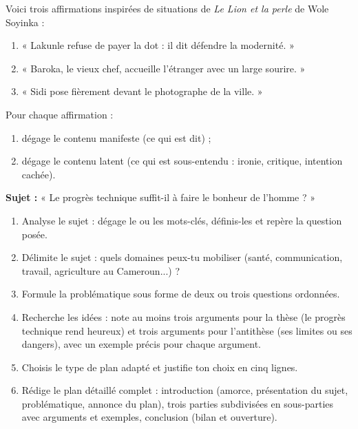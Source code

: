 \documentclass[11pt]{article}
\newcounter{popsec}
\newcounter{popsub}
\newcommand{\courssub}[1]{%
  \stepcounter{popsub}%
  \par\vspace{9pt}\noindent{\popxbold\fontsize{11.5}{13}\selectfont\color{popink}{\color{poporange}\thepopsec.\thepopsub}\hspace{6pt}#1}\par\nopagebreak\vspace{4pt}
}
\begin{document}
\begin{exercice}
Voici trois affirmations inspirées de situations de \emph{Le Lion et la perle} de Wole Soyinka :
\begin{enumerate}
\item « Lakunle refuse de payer la dot : il dit défendre la modernité. »
\item « Baroka, le vieux chef, accueille l'étranger avec un large sourire. »
\item « Sidi pose fièrement devant le photographe de la ville. »
\end{enumerate}
Pour chaque affirmation :
\begin{enumerate}[label=\alph*.]
\item dégage le contenu manifeste (ce qui est dit) ;
\item dégage le contenu latent (ce qui est sous-entendu : ironie, critique, intention cachée).
\end{enumerate}
\end{exercice}

\courssub{Je me prépare au Bac}

\begin{exercice}
\textbf{Sujet :} « Le progrès technique suffit-il à faire le bonheur de l'homme ? »

\begin{enumerate}
\item Analyse le sujet : dégage le ou les mots-clés, définis-les et repère la question posée.
\item Délimite le sujet : quels domaines peux-tu mobiliser (santé, communication, travail, agriculture au Cameroun...) ?
\item Formule la problématique sous forme de deux ou trois questions ordonnées.
\item Recherche les idées : note au moins trois arguments pour la thèse (le progrès technique rend heureux) et trois arguments pour l'antithèse (ses limites ou ses dangers), avec un exemple précis pour chaque argument.
\item Choisis le type de plan adapté et justifie ton choix en cinq lignes.
\item Rédige le plan détaillé complet : introduction (amorce, présentation du sujet, problématique, annonce du plan), trois parties subdivisées en sous-parties avec arguments et exemples, conclusion (bilan et ouverture).
\end{enumerate}
\end{exercice}
\end{document}
